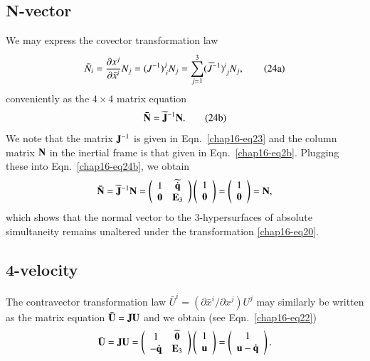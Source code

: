 \subsection{N-vector}\label{chap16-sec6.2}

We may express the covector transformation law
\begin{equation*}
\bar{N}_i=\frac{\partial x^j}{\partial \bar{x}^i}N_j=(J^{-1})^j_{\;i} N_j=\sum_{j=1}^3 (\widetilde{J}^{-1})^i_{\;j} N_j,\tag{24a}\label{chap16-eq24a}
\end{equation*}
conveniently as the $4\times4$ matrix equation 
\begin{equation*}
\mathbf{\bar{N}}= \widetilde{\mathbf{J}}^{-1} \mathbf{N}. \tag{24b}\label{chap16-eq24b}
\end{equation*} 
We note that the matrix ${\mathbf{J}^{-1}}$ is given in Eqn.~\eqref{chap16-eq23} and  the column matrix $\mathbf{N}$ in the inertial frame is that given in Eqn.~\eqref{chap16-eq2b}.  Plugging these into Eqn.~\eqref{chap16-eq24b}, we obtain 
\begin{equation}
\mathbf{\bar{N}}=\widetilde{\mathbf{J}}^{-1} \mathbf{N}= \left(\begin{array}{rc} 1 &  \widetilde{\mathbf{\dot{q}}} \\
\mathbf{0} & \mathbf{E}_3 \end{array}\right) 
\left(\begin{array}{rr} 
1\\\mathbf{0}\end{array}\right)
=\left(\begin{array}{c}  1\\{\mathbf{0}} \end{array}\right)
=\mathbf{N},\label{chap16-eq24}
\end{equation}
which shows that the normal vector to the 3-hypersurfaces of absolute simultaneity remains unaltered under the transformation \eqref{chap16-eq20}.

\subsection{4-velocity}\label{chap16-sec6.3}

The contravector transformation law  $\bar{U}^i=(\partial \bar{x}^i/\partial x^j) U^j$ may similarly be written as the matrix equation  $\mathbf{\bar{U}}=\mathbf{J} \mathbf{U}$ and we obtain (see Eqn.~\eqref{chap16-eq22})
\begin{equation}
\bar{\mathbf{U}}=\mathbf{J}{\mathbf{U}}=\left(\begin{array}{cc} 1 & \widetilde{\mathbf{0}}\\
-\mathbf{\dot{q}} & \mathbf{E}_3 \end{array}\right)
\left(\begin{array}{c} 1 \\ \mathbf{u} \end{array}\right)=\left(\begin{array}{c} 
1 \\ \mathbf{u}-\mathbf{\dot{q}} \end{array}\right).\label{chap16-eq25}
\end{equation}

